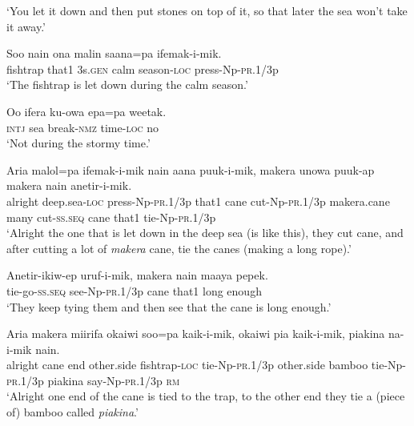 \glt ‘You let it down and then put stones on top of it, so that later the sea won’t take it away.’ \\
\z


\ea
\gll  Soo  nain  ona  malin  saana=pa  ifemak-i-mik. \\
fishtrap  that1  3s.\textsc{gen}  calm  season-\textsc{loc}  press-Np-\textsc{pr}.1/3p \\
\glt ‘The fishtrap is let down during the calm season.’ \\
\z


\ea
\gll  Oo  ifera  ku-owa  epa=pa  weetak. \\
\textsc{intj}  sea  break-\textsc{nmz}  time-\textsc{loc}  no \\
\glt ‘Not during the stormy time.’ \\
\z


\ea
\gll  Aria  malol=pa  ifemak-i-mik  nain  aana        puuk-i-mik,  makera  unowa  puuk-ap             makera  nain  anetir-i-mik. \\
alright  deep.sea-\textsc{loc}  press-Np-\textsc{pr}.1/3p  that1  cane  cut-Np-\textsc{pr}.1/3p  makera.cane  many  cut-\textsc{ss.seq}   cane  that1  tie-Np-\textsc{pr}.1/3p \\




\glt ‘Alright the one that is let down in the deep sea (is like this), they cut cane, and after cutting a lot of \textit{makera} cane, tie the canes (making a long rope).’ \\
\z


\ea
\gll  Anetir-ikiw-ep  uruf-i-mik,  makera  nain  maaya  pepek. \\
tie-go-\textsc{ss.seq}  see-Np-\textsc{pr}.1/3p  cane  that1  long  enough \\
\glt ‘They keep tying them and then see that the cane is long enough.’ \\
\z


\ea
\gll  Aria  makera  miirifa  okaiwi  soo=pa  kaik-i-mik,       okaiwi  pia  kaik-i-mik,  piakina  na-i-mik  nain. \\
alright  cane  end  other.side  fishtrap-\textsc{loc}  tie-Np-\textsc{pr}.1/3p   other.side  bamboo  tie{}-Np-\textsc{pr}.1/3p  piakina  say-Np-\textsc{pr}.1/3p  \textsc{rm} \\


\glt ‘Alright one end of the cane is tied to the trap, to the other end they tie a (piece of) bamboo called \textit{piakina}.’ \\
\z


